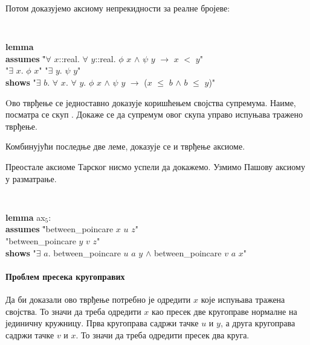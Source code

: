 Потом доказујемо аксиому непрекидности за реалне бројеве:

{\tt
\begin{tabbing}
\textbf{lem}\=\textbf{ma} \\
  \> \textbf{assumes} \= "$\forall$ $x$::real. $\forall$ $y$::real. $\phi$ $x$ $\land$ $\psi$ $y$ $\longrightarrow$ $x$ $<$ $y$" \\
          \> \> "$\exists$ $x$. $\phi$ $x$" "$\exists$ $y$. $\psi$ $y$" \\
  \> \textbf{shows} "$\exists$ $b$. $\forall$ $x$. $\forall$ $y$. $\phi$ $x$ $\land$ $\psi$ $y$ $\longrightarrow$ ($x$ $\le$ $b$ $\land$ $b$ $\le$ $y$)"
\end{tabbing}
}

Oво тврђење се једноставно доказује коришћењем својства
супремума. Наиме, посматра се скуп . Докаже се да
супремум овог скупа управо испуњава тражено тврђење.

Комбинујући последње две леме, доказује се и тврђење аксиоме. 

Преостале аксиоме Тарског нисмо успели да докажемо. Узмимо Пашову
аксиому у разматрање.

{\tt
\begin{tabbing}
\textbf{lem}\=\textbf{ma} ax$_5$: \\
    \> \textbf{assumes} \= "between\_poincare $x$ $u$ $z$" \\
    \> \>        "between\_poincare $y$ $v$ $z$" \\
    \> \textbf{shows} "$\exists$ $a$. between\_poincare $u$ $a$ $y$ $\land$ between\_poincare $v$ $a$ $x$"
\end{tabbing}
}


\paragraph{Проблем пресека кругоправих}

Да би доказали ово тврђење потребно је одредити $x$ које испуњава
тражена својства. То значи да треба одредити $x$ као пресек две
кругоправе нормалне на јединичну кружницу. Прва кругоправа садржи
тачке $u$ и $y$, а друга кругоправа садржи тачке $v$ и $x$. То значи
да треба одредити пресек два круга. 

